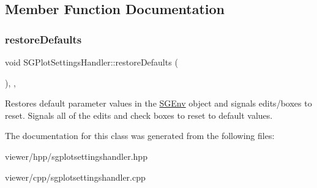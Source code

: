\subsection{Member Function Documentation}
\mbox{\label{classSGPlotSettingsHandler_a72b4008028a0aed28789c8151c38447e}} 
\subsubsection{\texorpdfstring{restore\+Defaults}{restoreDefaults}}
{\footnotesize\ttfamily void S\+G\+Plot\+Settings\+Handler\+::restore\+Defaults (\begin{DoxyParamCaption}{ }\end{DoxyParamCaption})\hspace{0.3cm}{\ttfamily [inline]}, {\ttfamily [private]}, {\ttfamily [slot]}}

Restores default parameter values in the \hyperlink{classSGEnv}{S\+G\+Env} object and signals edits/boxes to reset. Signals all of the edits and check boxes to reset to default values. 

The documentation for this class was generated from the following files\+:\begin{DoxyCompactItemize}
\item 
viewer/hpp/sgplotsettingshandler.\+hpp\item 
viewer/cpp/sgplotsettingshandler.\+cpp\end{DoxyCompactItemize}
